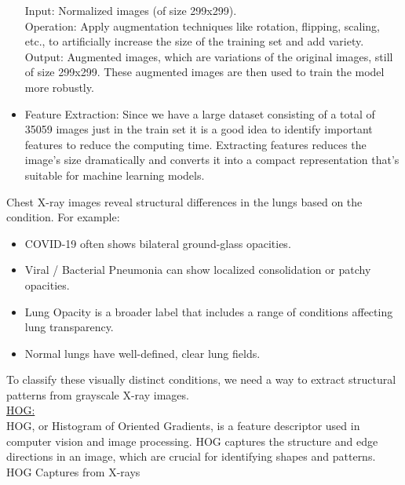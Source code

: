 \documentclass{article}
\begin{document}
\begin{itemize}
    Input: Normalized images (of size 299x299).\\
    Operation: Apply augmentation techniques like rotation, flipping, scaling, etc., to artificially increase the size of the training set and add variety.\\
    Output: Augmented images, which are variations of the original images, still of size 299x299. These augmented images are then used to train the model more robustly.\\
    \item Feature Extraction:
    Since we have a large dataset consisting of a total of 35059 images just in the train set it is a good idea to identify important features to reduce the computing time.
    Extracting features reduces the image's size dramatically and converts it into a compact representation that's suitable for machine learning models. 
\end{itemize}

Chest X-ray images reveal structural differences in the lungs based on the condition. For example:
\begin{itemize}
    \item COVID-19 often shows bilateral ground-glass opacities.
    \item Viral / Bacterial Pneumonia can show localized consolidation or patchy opacities.
    \item Lung Opacity is a broader label that includes a range of conditions affecting lung transparency.
    \item Normal lungs have well-defined, clear lung fields.
\end{itemize}

\vspace{0.5cm}

To classify these visually distinct conditions, we need a way to extract structural patterns from grayscale X-ray images.\\

\noindent \underline{HOG:}
\vspace{0.5cm}\\
HOG, or Histogram of Oriented Gradients, is a feature descriptor used in computer vision and image processing.  HOG captures the structure and edge directions in an image, which are crucial for identifying shapes and patterns.
\\

HOG Captures from X-rays
\end{document}
